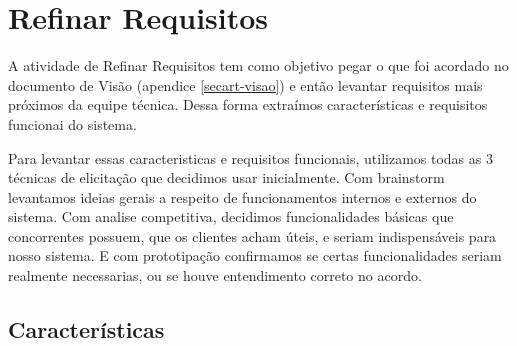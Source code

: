 \chapter{Refinar Requisitos}
\label{sec:refinar-req}

A atividade de Refinar Requisitos tem como objetivo pegar o que foi acordado no documento de Visão (apendice \ref{secart-visao}) e então levantar requisitos mais próximos da equipe técnica. Dessa forma extraímos características e requisitos funcionai do sistema.

Para levantar essas caracteristicas e requisitos funcionais, utilizamos todas as 3 técnicas de elicitação que decidimos usar inicialmente. Com brainstorm levantamos ideias gerais a respeito de funcionamentos internos e externos do sistema. Com analise competitiva, decidimos funcionalidades básicas que concorrentes possuem, que os clientes acham úteis, e seriam indispensáveis para nosso sistema. E com prototipação confirmamos se certas funcionalidades seriam realmente necessarias, ou se houve entendimento correto no acordo.

\section{Características}
\label{sec:carac}

